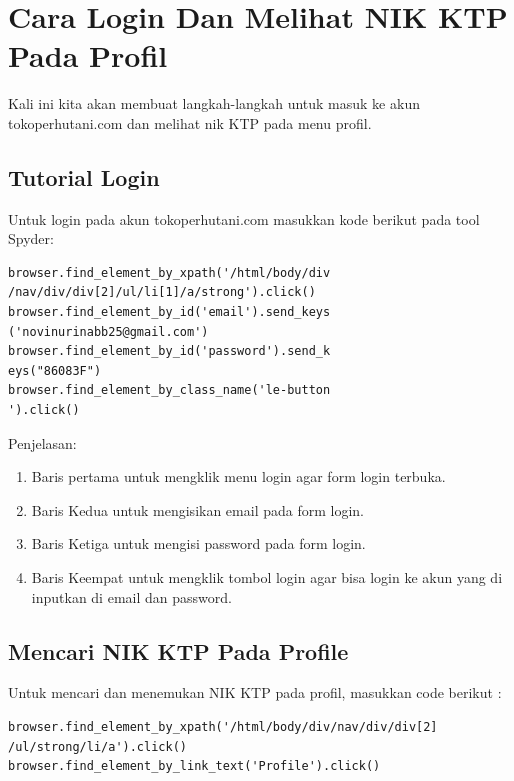 








































\newpage
\section{Cara Login Dan Melihat NIK KTP Pada Profil}
Kali ini kita akan membuat langkah-langkah untuk masuk ke akun tokoperhutani.com dan melihat nik KTP pada menu profil.  
\subsection{Tutorial Login}
Untuk login pada akun tokoperhutani.com masukkan kode berikut pada tool Spyder:
\begin{verbatim}
browser.find_element_by_xpath('/html/body/div
/nav/div/div[2]/ul/li[1]/a/strong').click()
browser.find_element_by_id('email').send_keys
('novinurinabb25@gmail.com')
browser.find_element_by_id('password').send_k
eys("86083F")
browser.find_element_by_class_name('le-button
').click()
\end{verbatim}

Penjelasan:
\begin{enumerate}
	\item Baris pertama untuk mengklik menu login agar form login terbuka.
	\item Baris Kedua untuk mengisikan email pada form login. 
	\item Baris Ketiga untuk mengisi password pada form login.
	\item Baris Keempat untuk mengklik tombol login agar bisa login ke akun yang di inputkan di email dan password.
\end{enumerate}

\newpage
\subsection{Mencari NIK KTP Pada Profile}
Untuk mencari dan menemukan NIK KTP pada profil, masukkan code berikut :
\begin{verbatim}
browser.find_element_by_xpath('/html/body/div/nav/div/div[2]
/ul/strong/li/a').click()
browser.find_element_by_link_text('Profile').click()
\end{verbatim}

